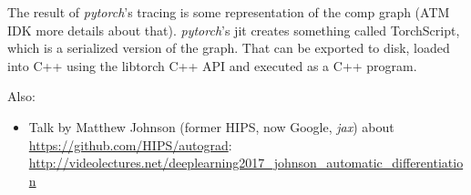 \documentclass[paper=a4,11pt,headsepline]{scrartcl}
\newcommand{\soft}[1]{\textsl{#1}\xspace}
\newcommand{\pytorch}{\soft{pytorch}}
\newcommand{\jax}{\soft{jax}}
\begin{document}
The result of \pytorch's tracing is some representation of the comp graph (ATM
IDK more details about that). \pytorch's jit creates something called
TorchScript, which is a serialized version of the graph. That can be exported
to disk, loaded into C++ using the libtorch C++ API and executed as a C++
program.





Also:

\begin{itemize}
    \item Talk by Matthew Johnson (former HIPS, now Google, \jax) about
        \url{https://github.com/HIPS/autograd}:
        \url{http://videolectures.net/deeplearning2017_johnson_automatic_differentiation}
\end{itemize}
\end{document}
